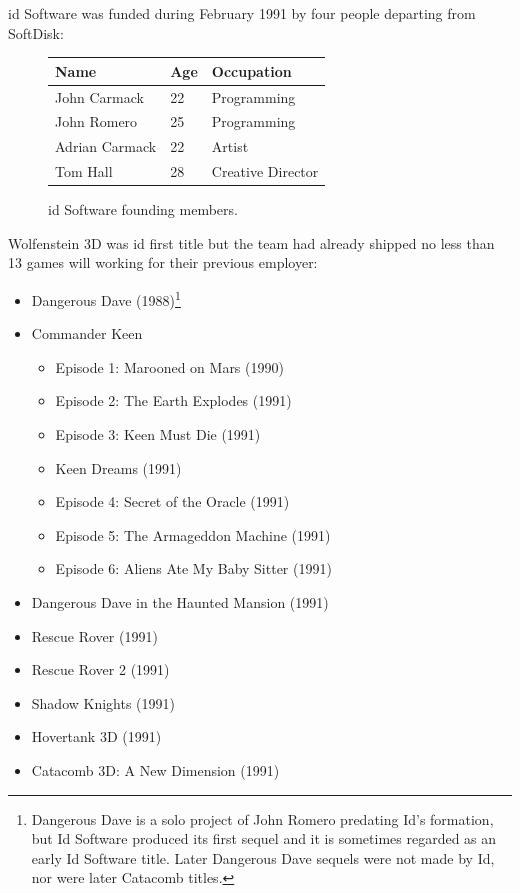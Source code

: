 \documentclass[book.tex]{subfiles}
\begin{document}
id Software was funded during February 1991 by four people departing from SoftDisk: 

 \begin{figure}[H]
\centering  
\begin{tabularx}{\textwidth}{ X  X  X  }
  \toprule
  \textbf{Name} &  \textbf{Age} & \textbf{Occupation} \\
  \toprule 
   John Carmack & 22 &  Programming\\
   John Romero & 25 &  Programming\\
   Adrian Carmack & 22 &  Artist\\
   Tom Hall & 28 &  Creative Director\\
     \toprule
\end{tabularx}
\caption{id Software founding members.}\label{fig:Id Software team}
\end{figure}

Wolfenstein 3D was id first title but the team had already shipped no less than 13 games will working for their previous employer:
\begin{itemize}
  \item Dangerous Dave (1988)\footnote{Dangerous Dave is a solo project of John Romero predating Id's formation, but Id Software produced its first sequel and it is sometimes regarded as an early Id Software title. Later Dangerous Dave sequels were not made by Id, nor were later Catacomb titles.}
  \item Commander Keen
  \begin{itemize}
    \item Episode 1: Marooned on Mars (1990)
    \item Episode 2: The Earth Explodes (1991)
    \item Episode 3: Keen Must Die (1991)
    \item Keen Dreams (1991)
    \item Episode 4: Secret of the Oracle (1991)
    \item Episode 5: The Armageddon Machine (1991)
    \item Episode 6: Aliens Ate My Baby Sitter (1991)
  \end{itemize}
  
  \item Dangerous Dave in the Haunted Mansion (1991)
  \item Rescue Rover (1991)
  \item Rescue Rover 2 (1991)
  \item Shadow Knights (1991)
  \item Hovertank 3D (1991)
  \item Catacomb 3D: A New Dimension (1991)
\end{itemize}
\end{document}
